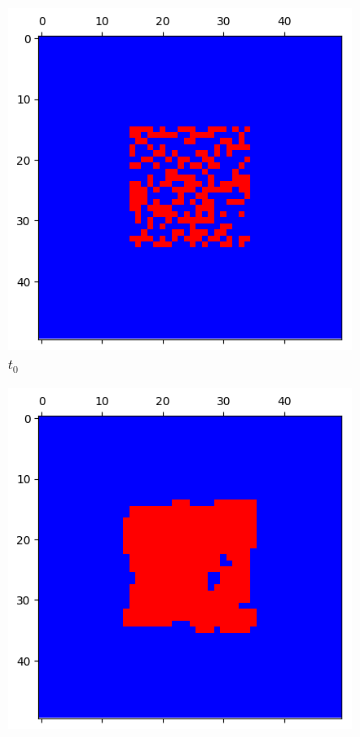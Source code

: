 \documentclass[letterpaper]{article}
\begin{document}
\begin{figure}[H]
    \begin{subfigure}{.33\textwidth}
      \centering
      \includegraphics[width=1\linewidth]{images/assign2/part31-coop/t0}
      \caption{$t_{0}$}
    \end{subfigure}
    \begin{subfigure}{.33\textwidth}
      \centering
      \includegraphics[width=1\linewidth]{images/assign2/part31-coop/t1}

\end{subfigure}
\end{figure}
\end{document}
